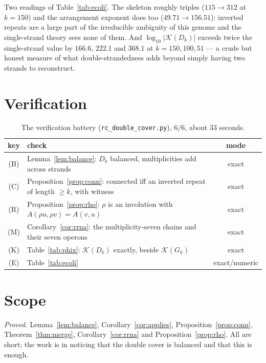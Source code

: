 \documentclass[11pt]{article}
\theoremstyle{plain}
\theoremstyle{definition}
\theoremstyle{remark}
\newcommand{\K}{\mathcal{K}}
\begin{document}
Two readings of Table~\ref{tab:ecoli}. The skeleton roughly triples ($115\to312$ at
$k=150$) and the arrangement exponent does too ($49.71\to156.51$): inverted repeats are a
large part of the irreducible ambiguity of this genome and the single-strand theory sees
none of them. And $\log_{10}|\K(D_k)|$ exceeds twice the single-strand value by $166.6$,
$222.1$ and $368.1$ at $k=150,100,51$ --- a crude but honest measure of what
double-strandedness adds beyond simply having two strands to reconstruct.

\section{Verification}\label{sec:battery}

\begin{table}[ht]
\centering\small
\begin{tabular}{clc}
\toprule
key & check & mode\\
\midrule
(B) & Lemma~\ref{lem:balance}: $D_k$ balanced, multiplicities add across strands & exact\\
(C) & Proposition~\ref{prop:conn}: connected iff an inverted repeat of length $\ge k$, with witness & exact\\
(R) & Proposition~\ref{prop:rho}: $\rho$ is an involution with $A(\rho u,\rho v)=A(v,u)$ & exact\\
(M) & Corollary~\ref{cor:rrna}: the multiplicity-seven chains and their seven operons & exact\\
(K) & Table~\ref{tab:phix}: $\K(D_k)$ exactly, beside $\K(G_k)$ & exact\\
(E) & Table~\ref{tab:ecoli} & exact/numeric\\
\bottomrule
\end{tabular}
\caption{The verification battery (\texttt{rc\_double\_cover.py}), $6/6$, about $33$
seconds.}
\label{tab:battery}
\end{table}

\section{Scope}\label{sec:scope}

\emph{Proved.} Lemma~\ref{lem:balance}, Corollary~\ref{cor:applies},
Proposition~\ref{prop:conn}, Theorem~\ref{thm:merge}, Corollary~\ref{cor:rrna} and
Proposition~\ref{prop:rho}. All are short; the work is in noticing that the double cover
is balanced and that this is enough.
\end{document}
